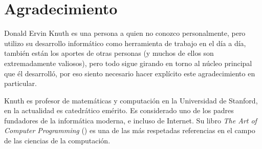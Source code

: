 \documentclass{book}
\begin{document}
{%
%
%
%
%
%

\chapter{Agradecimiento}

\noindent Donald Ervin Knuth es una persona a quien no conozco personalmente, pero utilizo su desarrollo informático como herramienta de trabajo en el día a día, también están los aportes de otras personas (y muchos de ellos son extremadamente valiosos), pero todo sigue girando en torno al núcleo principal que él desarrolló, por eso siento necesario hacer explícito este agradecimiento en particular.

Knuth es profesor de matemáticas y computación en la Universidad de Stanford, en la actualidad es catedrático emérito. Es considerado uno de los padres fundadores de la informática moderna, e incluso de Internet. Su libro \emph{The Art of Computer Programming} (\cite*{Knuth2011}) es una de las más respetadas referencias en el campo de las ciencias de la computación.

}
\end{document}
